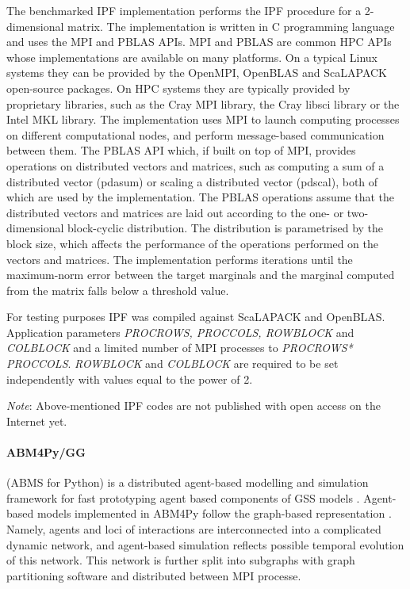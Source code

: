 The benchmarked IPF implementation performs the IPF procedure for a 2-dimensional matrix.
The implementation is written in C programming language and uses the MPI and PBLAS APIs. MPI and PBLAS are common HPC APIs whose implementations are available on many platforms. On a typical Linux systems they can be provided by the OpenMPI, OpenBLAS and \textsf{ScaLAPACK} open-source packages. On HPC systems they are typically provided by proprietary libraries, such as the Cray MPI library, the Cray libsci library or the Intel MKL library.
The implementation uses MPI to launch computing processes on different computational nodes, and perform message-based communication between them. The PBLAS API which, if built on top of MPI, provides operations on distributed vectors and matrices, such as computing a sum of a distributed vector (pdasum) or scaling a distributed vector (pdscal), both of which are used by the implementation.
The PBLAS operations assume that the distributed vectors and matrices are laid out according to the one- or two-dimensional block-cyclic distribution. The distribution is parametrised by the block size, which affects the performance of the operations performed on the vectors and matrices.
The implementation performs iterations until the maximum-norm error between the target marginals and the marginal computed from the matrix falls below a threshold value.

For testing purposes IPF was compiled against \textsf{ScaLAPACK} and OpenBLAS. 
Application parameters \textit{PROCROWS, PROCCOLS, ROWBLOCK} and \textit{COLBLOCK}  and a limited number of MPI processes to \textit{PROCROWS* PROCCOLS}. \textit{ROWBLOCK} and \textit{COLBLOCK} are required to be set independently with values equal to the power of 2.

\fi

\textit{Note}: Above-mentioned IPF codes are not published with open access on the Internet yet.

\paragraph{ABM4Py/GG} (ABMS for Python) is a distributed agent-based modelling and simulation framework for fast prototyping agent based components of GSS models \cite{2018:abm4py}.
Agent-based models implemented in \textsf{ABM4Py} follow the graph-based representation \cite{2018:abm4py,2017:graph_abms}.
Namely, agents and loci of interactions are interconnected into a complicated dynamic network, and agent-based simulation reflects possible temporal evolution of this network.
This network is further split into subgraphs with graph partitioning software and distributed between MPI processe.

